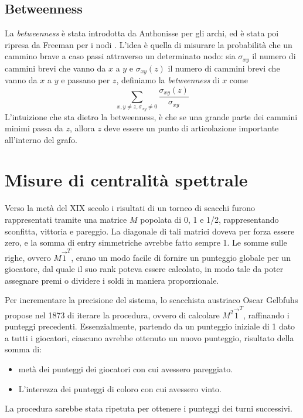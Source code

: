 \subsection{Betweenness}
La \textit{betweenness} è stata introdotta da Anthonisse \cite{ant} per gli archi, ed è stata poi ripresa da Freeman per i nodi \cite{morgan}. L'idea è quella di misurare la probabilità che un cammino brave a caso passi attraverso un determinato nodo: sia $\sigma_{xy}$ il numero di cammini brevi che vanno da $x$ a $y$ e $\sigma_{xy}(z)$ il numero di cammini brevi che vanno da $x$ a $y$ e passano per $z$, definiamo la \textit{betweenness} di $x$ come
\begin{equation*}
    \sum_{x, y \neq z, \sigma_{xy} \neq 0}{\frac{\sigma_{xy}(z)}{\sigma_{xy}}}
\end{equation*}
L'intuizione che sta dietro la betweenness, è che se una grande parte dei cammini minimi passa da $z$, allora $z$ deve essere un punto di articolazione importante all'interno del grafo.
\section{Misure di centralità spettrale}
Verso la metà del XIX secolo i risultati di un torneo di scacchi furono rappresentati tramite una matrice $M$ popolata di 0, 1 e 1/2, rappresentando sconfitta, vittoria e pareggio. La diagonale di tali matrici doveva per forza essere zero, e la somma di entry simmetriche avrebbe fatto sempre 1. Le somme sulle righe, ovvero $M\vec{1}^T$, erano un modo facile di fornire un punteggio globale per un giocatore, dal quale il suo rank poteva essere calcolato, in modo tale da poter assegnare premi o dividere i soldi in maniera proporzionale.

Per incrementare la precisione del sistema, lo scacchista austriaco Oscar Gelbfuhs propose nel 1873 di iterare la procedura, ovvero di calcolare $M^2\vec{1}^T$, raffinando i punteggi precedenti. Essenzialmente, partendo da un punteggio iniziale di 1 dato a tutti i giocatori, ciascuno avrebbe ottenuto un nuovo punteggio, risultato della somma di:
\begin{itemize}
    \item metà dei punteggi dei giocatori con cui avessero pareggiato.
    \item L'interezza dei punteggi di coloro con cui avessero vinto.
\end{itemize}
La procedura sarebbe stata ripetuta per ottenere i punteggi dei turni successivi.

